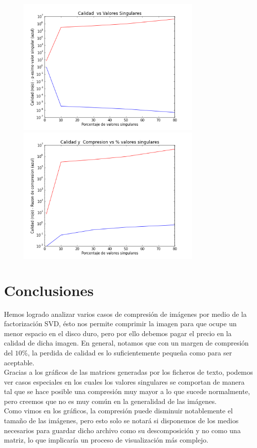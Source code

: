 \documentclass[spanish, fleqn]{article}
\begin{document}
\begin{figure}[htbp]
\begin{minipage}[b]{0.5\linewidth}
			\includegraphics[width=90mm]{./Graficos/matriz5-quality}
			\includegraphics[width=90mm]{./Graficos/matriz5-size}
			\label{fig:figura8}
		\end{minipage}
	\end{figure}
\section{Conclusiones}
	Hemos logrado analizar varios casos de compresión de imágenes por medio de
	la factorización SVD, ésto nos permite comprimir la imagen para que ocupe
	un menor espacio en el disco duro, pero por ello debemos pagar el precio
	en la calidad de dicha imagen. En general, notamos que con un margen de
	compresión del $10\%$, la perdida de calidad es lo suficientemente pequeña
	como para ser aceptable.\\
	Gracias a los gráficos de las matrices generadas por los ficheros de texto,
	podemos ver casos especiales en los cuales los valores singulares se
	comportan de manera tal que se hace posible una compresión muy mayor a lo
	que sucede normalmente, pero creemos que no es muy común en la generalidad
	de las imágenes.\\
	Como vimos en los gráficos, la compresión puede disminuir notablemente el
	tamaño de las imágenes, pero esto solo se notará si disponemos de los medios
	necesarios para guardar dicho archivo como su descomposición y no como una
	matriz, lo que implicaría un proceso de visualización más complejo.
\end{document}
